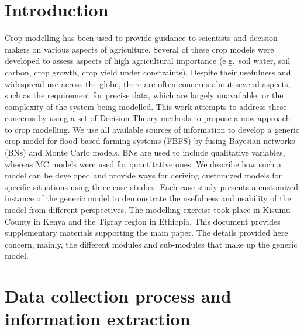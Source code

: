 \documentclass[]{elsarticle} %
\newcommand{\beginsupplement}{\setcounter{table}{0}
\renewcommand{\thetable}{S\arabic{table}} \setcounter{figure}{0}
\renewcommand{\thefigure}{S\arabic{figure}}}
\begin{document}
\beginsupplement

\hypertarget{introduction}{%
\section*{Introduction}\label{introduction}}

Crop modelling has been used to provide guidance to scientists and decision-makers on various aspects of agriculture. Several of these crop models were developed to assess aspects of high agricultural importance (e.g.~soil water, soil carbon, crop growth, crop yield under constraints). Despite their usefulness and widespread use across the globe, there are often concerns about several aspects, such as the requirement for precise data, which are largely unavailable, or the complexity of the system being modelled.
This work attempts to address these concerns by using a set of Decision Theory methods to propose a new approach to crop modelling. We use all available sources of information to develop a generic crop model for flood-based farming systems (FBFS) by fusing Bayesian networks (BNs) and Monte Carlo models. BNs are used to include qualitative variables, whereas MC models were used for quantitative ones. We describe how such a model can be developed and provide ways for deriving customized models for specific situations using three case studies. Each case study presents a customized instance of the generic model to demonstrate the usefulness and usability of the model from different perspectives. The modelling exercise took place in Kisumu County in Kenya and the Tigray region in Ethiopia. This document provides supplementary materials supporting the main paper. The details provided here concern, mainly, the different modules and sub-modules that make up the generic model.

\hypertarget{data-collection-process-and-information-extraction}{%
\section{Data collection process and information extraction}\label{data-collection-process-and-information-extraction}}
\end{document}
